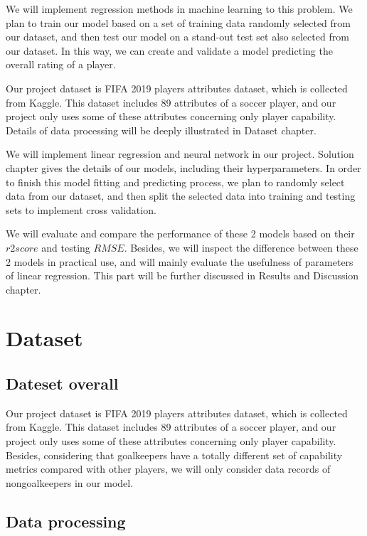 \documentclass{article}
\begin{document}
We will implement regression methods in machine learning to this problem. We plan to train our model based on a set of training data randomly selected from our dataset, and then test our model on a stand-out test set also selected from our dataset. In this way, we can create and validate a model predicting the overall rating of a player.


Our project dataset is FIFA 2019 players attributes dataset, which is collected from Kaggle. This dataset includes 89 attributes of a soccer player, and our project only uses some of these attributes concerning only player capability. Details of data processing will be deeply illustrated in Dataset chapter.

We will implement linear regression and neural network in our project. Solution chapter gives the details of our models, including their hyperparameters. In order to finish this model fitting and predicting process, we plan to randomly select data from our dataset, and then split the selected data into training and testing sets to implement cross validation.

We will evaluate and compare the performance of these 2 models based on their $r2 score$ and testing $RMSE$. Besides, we will inspect the difference between these 2 models in practical use, and will mainly evaluate the usefulness of parameters of linear regression. This part will be further discussed in Results and Discussion chapter.


\section*{Dataset}

\subsection*{Dateset overall}

Our project dataset is FIFA 2019 players attributes dataset, which is collected
from Kaggle. This dataset includes 89 attributes of a soccer player, and our
project only uses some of these attributes concerning only player capability.
Besides, considering that goalkeepers have a totally different set of capability
metrics compared with other players, we will only consider data records of nongoalkeepers in our model.



\subsection*{Data processing}
\end{document}
